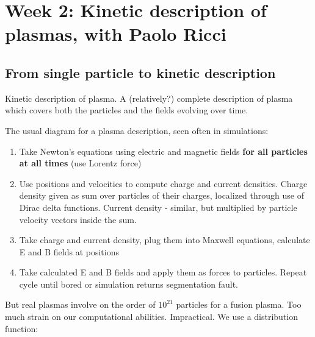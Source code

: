 \documentclass[PlasmaNotes.tex]{subfiles}
\begin{document}
\setcounter{section}{1}

\section{Week 2: Kinetic description of plasmas, with Paolo Ricci}
\subsection{From single particle to kinetic description}
	Kinetic description of plasma. A (relatively?) complete description of plasma which covers both the particles and the fields evolving over time.

The usual diagram for a plasma description, seen often in simulations:
\begin{enumerate}
	\item Take Newton's equations using electric and magnetic fields \textbf{for all particles at all times} (use Lorentz force)
	\item Use positions and velocities to compute charge and current densities. Charge density given as sum over particles of their charges, localized through use of Dirac delta functions. Current density - similar, but multiplied by particle velocity vectors inside the sum.
	\item Take charge and current density, plug them into Maxwell equations, calculate E and B fields at positions
	\item Take calculated E and B fields and apply them as forces to particles. Repeat cycle until bored or simulation returns segmentation fault.
\end{enumerate}
But real plasmas involve on the order of $10^{21}$ particles for a fusion plasma. Too much strain on our computational abilities. Impractical. We use a distribution function:
\end{document}
